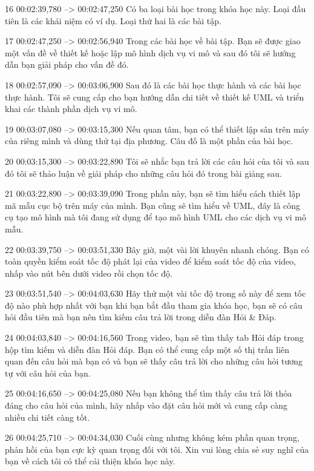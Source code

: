 16
00:02:39,780 --> 00:02:47,250
Có ba loại bài học trong khóa học này.  Loại đầu tiên là các khái niệm có ví dụ.  Loại thứ hai là các bài tập.

17
00:02:47,250 --> 00:02:56,940
Trong các bài học về bài tập.  Bạn sẽ được giao một vấn đề về thiết kế hoặc lập mô hình dịch vụ vi mô và sau đó tôi sẽ hướng dẫn bạn giải pháp cho vấn đề đó.

18
00:02:57,090 --> 00:03:06,900
Sau đó là các bài học thực hành và các bài học thực hành.  Tôi sẽ cung cấp cho bạn hướng dẫn chi tiết về thiết kế UML và triển khai các thành phần dịch vụ vi mô.

19
00:03:07,080 --> 00:03:15,300
Nếu quan tâm, bạn có thể thiết lập sân trên máy của riêng mình và dùng thử tại địa phương.  Câu đố là một phần của bài học.

20
00:03:15,300 --> 00:03:22,890
Tôi sẽ nhắc bạn trả lời các câu hỏi của tôi và sau đó tôi sẽ thảo luận về giải pháp cho những câu hỏi đó trong bài giảng sau.

21
00:03:22,890 --> 00:03:39,090
Trong phần này, bạn sẽ tìm hiểu cách thiết lập mã mẫu cục bộ trên máy của mình.  Bạn cũng sẽ tìm hiểu về UML, đây là công cụ tạo mô hình mà tôi đang sử dụng để tạo mô hình UML cho các dịch vụ vi mô mẫu.

22
00:03:39,750 --> 00:03:51,330
Bây giờ, một vài lời khuyên nhanh chóng.  Bạn có toàn quyền kiểm soát tốc độ phát lại của video để kiểm soát tốc độ của video, nhấp vào nút bên dưới video rồi chọn tốc độ.

23
00:03:51,540 --> 00:04:03,630
Hãy thử một vài tốc độ trong số này để xem tốc độ nào phù hợp nhất với bạn khi bạn bắt đầu tham gia khóa học, bạn sẽ có câu hỏi đầu tiên mà bạn nên tìm kiếm câu trả lời trong diễn đàn Hỏi & Đáp.

24
00:04:03,840 --> 00:04:16,560
Trong video, bạn sẽ tìm thấy tab Hỏi đáp trong hộp tìm kiếm và diễn đàn Hỏi đáp.  Bạn có thể cung cấp một số thị trấn liên quan đến câu hỏi mà bạn có và bạn sẽ thấy câu trả lời cho những câu hỏi tương tự với câu hỏi của bạn.

25
00:04:16,650 --> 00:04:25,080
Nếu bạn không thể tìm thấy câu trả lời thỏa đáng cho câu hỏi của mình, hãy nhấp vào đặt câu hỏi mới và cung cấp càng nhiều chi tiết càng tốt.

26
00:04:25,710 --> 00:04:34,030
Cuối cùng nhưng không kém phần quan trọng, phản hồi của bạn cực kỳ quan trọng đối với tôi. Xin vui lòng chia sẻ suy nghĩ của bạn về cách tôi có thể cải thiện khóa học này.

